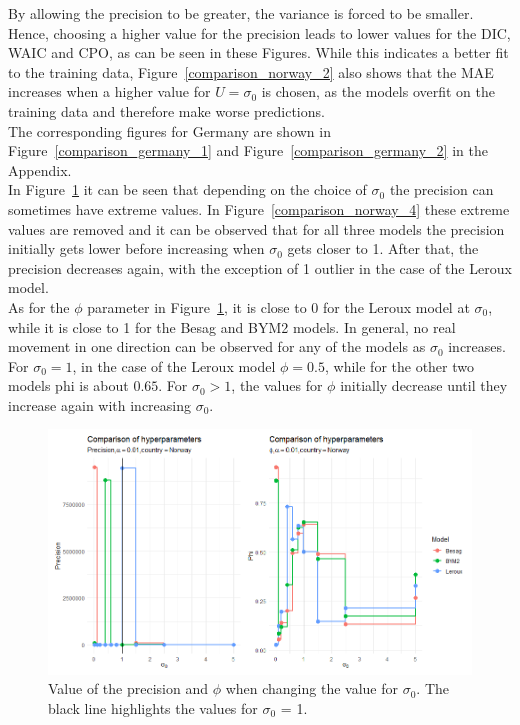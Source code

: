 %     
By allowing the precision to be greater, the variance is forced to be smaller. Hence, choosing a higher value for the precision leads to lower values for the DIC, WAIC and CPO, as can be seen in these Figures. While this indicates a better fit to the training data, Figure~\ref{comparison_norway_2} also shows that the MAE increases when a higher value for $U=\sigma_0$ is chosen, as the models overfit on the training data and therefore make worse predictions. \\
The corresponding figures for Germany are shown in Figure~\ref{comparison_germany_1} and Figure~\ref{comparison_germany_2} in the Appendix. \\
In Figure~\ref{comparison_norway_3} it can be seen that depending on the choice of $\sigma_0$ the precision can sometimes have extreme values. In Figure~\ref{comparison_norway_4} these extreme values are removed and it can be observed that for all three models the precision initially gets lower before increasing when $\sigma_0$ gets closer to 1. After that, the precision decreases again, with the exception of 1 outlier in the case of the Leroux model. \\
As for the $\phi$ parameter in Figure~\ref{comparison_norway_3}, it is close to 0 for the Leroux model at $\sigma_0$, while it is close to 1 for the Besag and BYM2 models. In general, no real movement in one direction can be observed for any of the models as $\sigma_0$ increases. For $\sigma_0 = 1$, in the case of the Leroux model $\phi = 0.5$, while for the other two models phi is about $0.65$. For $\sigma_0 > 1$, the values for $\phi$ initially decrease until they increase again with increasing $\sigma_0$.
\begin{figure}[H]
    \centering
    \includegraphics[width = \textwidth]{hyper_comp_norway_1.png}
    \caption{Value of the precision and $\phi$ when changing the value for $\sigma_0$. The black line highlights the values for $\sigma_0$ = 1.}
    \label{comparison_norway_3}
\end{figure}
